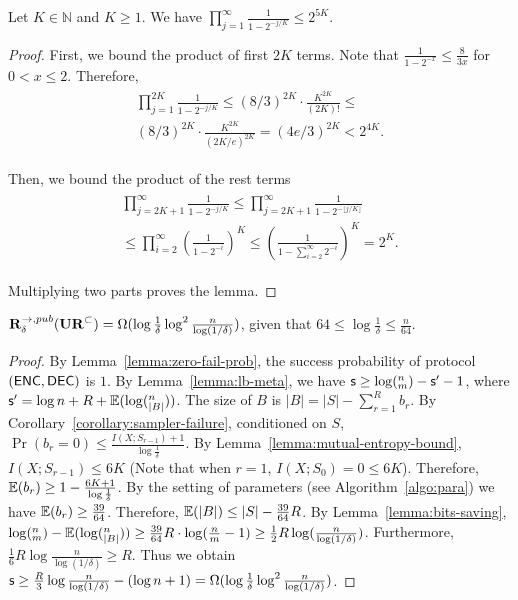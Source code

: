 \begin{lemma}\label{lemma:Pochhammer}
  Let $K\in \mathbb{N}$ and $K\ge 1$. We have $\prod_{j=1}^{\infty} \frac{1}{1-2^{-j/K}}\le 2^{5K}$.
\end{lemma}

\begin{proof}
  First, we bound the product of first $2K$ terms. Note that $\frac{1}{1-2^{-x}}\le \frac{8}{3x}$ for $0<x\le 2$. Therefore, 
  \begin{align}
  \begin{split}
    \prod_{j=1}^{2K}\frac{1}{1-2^{-j/K}}
    \le (8/3)^{2K}\cdot \frac{K^{2K}}{(2K)!}
    \le \\
    (8/3)^{2K}\cdot \frac{K^{2K}}{(2K/e)^{2K}}
    = (4e/3)^{2K}
    < 2^{4K}.
    \end{split}
  \end{align}
  
  Then, we bound the product of the rest terms
  \begin{align}
  \begin{split}
    \prod_{j=2K+1}^{\infty}\frac{1}{1-2^{-j/K}} 
    \le \prod_{j=2K+1}^{\infty}\frac{1}{1-2^{-\lfloor j/K \rfloor}} \\
    \le \prod_{i=2}^{\infty}\left( \frac{1}{1-2^{-i}}\right)^K 
    \le \left( \frac{1}{1-\sum_{i=2}^{\infty}2^{-i}}\right)^K
    = 2^K.
    \end{split}
  \end{align}
  
  Multiplying two parts proves the lemma.
\end{proof}

\begin{theorem}
  $\mathbf{R}^{\rightarrow,pub}_\delta(\mathbf{UR}^\subset) = \Omega(\log \frac{1}{\delta}\log^2 \frac{n}{\log (1/\delta)} )$, given that $64 \le \log \frac{1}{\delta} \le \frac{n}{64}$.
\end{theorem}

\begin{proof}
  By Lemma~\ref{lemma:zero-fail-prob}, the success probability of protocol $(\textsf{ENC},\textsf{DEC})$ is $1$. 
  By Lemma~\ref{lemma:lb-meta}, we have $\textsf{s}\ge \log (^n_m) - \textsf{s}' -1$, where $\textsf{s}'=\log n + R+ \operatorname*{\mathbb{E}}(\log (^n_{|B|}))$. 
  The size of $B$ is $|B|=|S|-\sum_{r=1}^{R}{b_r}$.
  By Corollary~\ref{corollary:sampler-failure}, conditioned on $S$, $\Pr(b_r=0)\le \frac{I(X;S_{r-1})+1}{\log\frac{1}{\delta}}$. 
  By Lemma~\ref{lemma:mutual-entropy-bound}, $I(X;S_{r-1})\le 6K$ (Note that when $r=1$, $I(X;S_0)=0\le 6K$). 
  Therefore, $\operatorname*{\mathbb{E}}(b_r)\ge 1-\frac{6K+1}{\log\frac{1}{\delta}}$.
  By the setting of parameters (see Algorithm~\ref{algo:para}) we have $\operatorname*{\mathbb{E}}(b_r)\ge \frac{39}{64}$. Therefore, $\operatorname*{\mathbb{E}}(|B|)\le |S|-\frac{39}{64}R$. 
  By Lemma~\ref{lemma:bits-saving}, $\log (^n_m)-\operatorname*{\mathbb{E}}(\log (^n_{|B|}))\ge \frac{39}{64}R\cdot \log (\frac{n}{m}-1) \ge \frac{1}{2}R\log (\frac{n}{\log(1/\delta)})$. 
  Furthermore, $\frac{1}{6}R\log \frac{n}{\log (1/\delta)} \ge R$.
  Thus we obtain $\textsf{s} \ge \frac{R}{3}\log \frac{n}{\log(1/\delta)} -(\log n + 1)  =\Omega(\log \frac{1}{\delta}\log^2 \frac{n}{\log (1/\delta)} )$.
\end{proof}